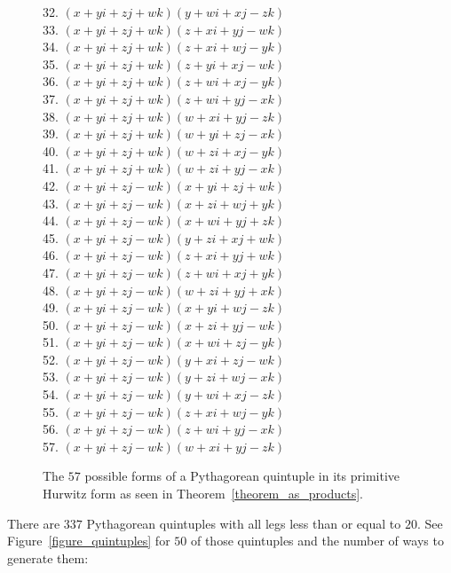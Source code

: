 \documentclass[12pt,table]{article}
\theoremstyle{definition}
\theoremstyle{remark}
\numberwithin{equation}{section}
\begin{document}
\begin{appendices}
{\begin{figure}
\begin{tabbing}
32. $(x+yi+zj+wk)(y+wi+xj-zk)$ \\
33. $(x+yi+zj+wk)(z+xi+yj-wk)$ \\
34. $(x+yi+zj+wk)(z+xi+wj-yk)$ \\
35. $(x+yi+zj+wk)(z+yi+xj-wk)$ \\
36. $(x+yi+zj+wk)(z+wi+xj-yk)$ \\
37. $(x+yi+zj+wk)(z+wi+yj-xk)$ \\
38. $(x+yi+zj+wk)(w+xi+yj-zk)$ \\
39. $(x+yi+zj+wk)(w+yi+zj-xk)$ \\
40. $(x+yi+zj+wk)(w+zi+xj-yk)$ \\
41. $(x+yi+zj+wk)(w+zi+yj-xk)$ \\
42. $(x+yi+zj-wk)(x+yi+zj+wk)$ \\
43. $(x+yi+zj-wk)(x+zi+wj+yk)$ \\
44. $(x+yi+zj-wk)(x+wi+yj+zk)$ \\
45. $(x+yi+zj-wk)(y+zi+xj+wk)$ \\
46. $(x+yi+zj-wk)(z+xi+yj+wk)$ \\
47. $(x+yi+zj-wk)(z+wi+xj+yk)$ \\
48. $(x+yi+zj-wk)(w+zi+yj+xk)$ \\
49. $(x+yi+zj-wk)(x+yi+wj-zk)$ \\
50. $(x+yi+zj-wk)(x+zi+yj-wk)$ \\
51. $(x+yi+zj-wk)(x+wi+zj-yk)$ \\
52. $(x+yi+zj-wk)(y+xi+zj-wk)$ \\
53. $(x+yi+zj-wk)(y+zi+wj-xk)$ \\
54. $(x+yi+zj-wk)(y+wi+xj-zk)$ \\
55. $(x+yi+zj-wk)(z+xi+wj-yk)$ \\
56. $(x+yi+zj-wk)(z+wi+yj-xk)$ \\
57. $(x+yi+zj-wk)(w+xi+yj-zk)$ 
\end{tabbing}
\caption{The $57$ possible forms of a Pythagorean quintuple in its primitive Hurwitz form as seen in Theorem~\ref{theorem_as_products}.} 
\label{figure_57}
\end{figure}
}



There are $337$ Pythagorean quintuples 
with all legs less than or equal to $20$.
See Figure~\ref{figure_quintuples}
for $50$ of those quintuples and
the number of ways to generate them:



\end{appendices}
\end{document}
